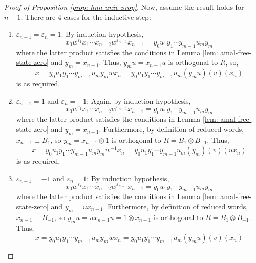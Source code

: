 \documentclass[10pt,a4paper]{amsart}
\begin{document}
\begin{proof}[Proof of Proposition \ref{prop: hnn-univ-prop}]
    Now, assume the result holds for $n - 1$. There are 4 cases for the inductive step:
    \begin{enumerate}
        \item $\varepsilon_{n-1} = \varepsilon_n = 1$: By induction hypothesis,
        \begin{equation*}
            x_0w^{\varepsilon_1}x_1\cdots x_{n-2}w^{\varepsilon_{n-1}}x_{n-1} = y_0u_1y_1 \cdots y_{m-1}u_my_m
        \end{equation*}
        where the latter product satisfies the conditions in Lemma \ref{lem: amal-free-state-zero} and $y_m = x_{n-1}$. Thus, $y_mu = x_{n-1}u$ is orthogonal to $R$, so,
        \begin{equation*}
            x = y_0u_1y_1 \cdots y_{m-1}u_my_mwx_n = y_0u_1y_1 \cdots y_{m-1}u_m(y_mu)(v)(x_n)
        \end{equation*}
        is as required.
        \item $\varepsilon_{n-1} = 1$ and $\varepsilon_n = -1$: Again, by induction hypothesis,
        \begin{equation*}
            x_0w^{\varepsilon_1}x_1\cdots x_{n-2}w^{\varepsilon_{n-1}}x_{n-1} = y_0u_1y_1 \cdots y_{m-1}u_my_m
        \end{equation*}
        where the latter product satisfies the conditions in Lemma \ref{lem: amal-free-state-zero} and $y_m = x_{n-1}$. Furthermore, by definition of reduced words, $x_{n-1} \perp B_1$, so $y_m = x_{n-1} \otimes 1$ is orthogonal to $R = B_1 \otimes B_{-1}$. Thus,
        \begin{equation*}
            x = y_0u_1y_1 \cdots y_{m-1}u_my_mw^{-1}x_n = y_0u_1y_1 \cdots y_{m-1}u_m(y_m)(v)(ux_n)
        \end{equation*}
        is as required.
        \item $\varepsilon_{n-1} = -1$ and $\varepsilon_n = 1$: By induction hypothesis,
        \begin{equation*}
            x_0w^{\varepsilon_1}x_1\cdots x_{n-2}w^{\varepsilon_{n-1}}x_{n-1} = y_0u_1y_1 \cdots y_{m-1}u_my_m
        \end{equation*}
        where the latter product satisfies the conditions in Lemma \ref{lem: amal-free-state-zero} and $y_m = ux_{n-1}$. Furthermore, by definition of reduced words, $x_{n-1} \perp B_{-1}$, so $y_mu = ux_{n-1}u = 1 \otimes x_{n-1}$ is orthogonal to $R = B_1 \otimes B_{-1}$. Thus,
        \begin{equation*}
            x = y_0u_1y_1 \cdots y_{m-1}u_my_mwx_n = y_0u_1y_1 \cdots y_{m-1}u_m(y_mu)(v)(x_n)

\end{equation*}
\end{enumerate}
\end{proof}
\end{document}

